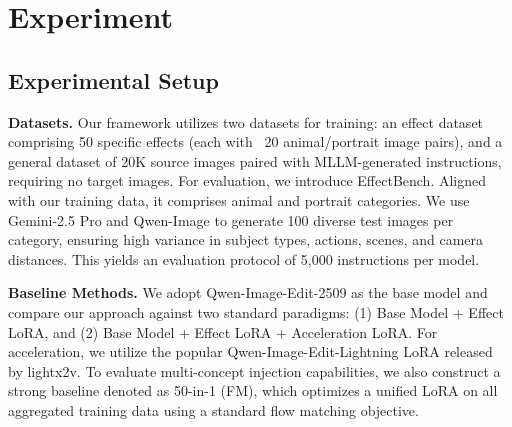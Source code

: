 \section{Experiment}
\label{sec:exp}

\vspace{-0.1cm}
\subsection{Experimental Setup}
\label{subsec:experimental_setup}
\textbf{Datasets.} 
Our framework utilizes two datasets for training: an effect dataset comprising 50 specific effects (each with ~20 animal/portrait image pairs), and a general dataset of 20K source images paired with MLLM-generated instructions, requiring no target images.
For evaluation, we introduce EffectBench. Aligned with our training data, it comprises animal and portrait categories. We use Gemini-2.5 Pro and Qwen-Image \cite{qwenimage} to generate 100 diverse test images per category, ensuring high variance in subject types, actions, scenes, and camera distances. This yields an evaluation protocol of 5,000 instructions per model.

\noindent
\textbf{Baseline Methods.} We adopt Qwen-Image-Edit-2509 \cite{qwenimage} as the base model and compare our approach against two standard paradigms: (1) Base Model + Effect LoRA, and (2) Base Model + Effect LoRA + Acceleration LoRA. For acceleration, we utilize the popular Qwen-Image-Edit-Lightning LoRA released by lightx2v\cite{lightx2v}. To evaluate multi-concept injection capabilities, we also construct a strong baseline denoted as 50-in-1 (FM), which optimizes a unified LoRA on all aggregated training data using a standard flow matching objective.


